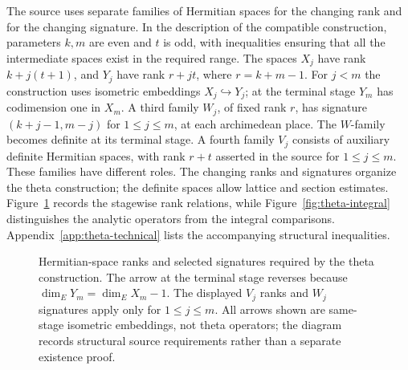 \documentclass[11pt,openany,oneside]{scrbook}
\theoremstyle{definition}
\theoremstyle{remark}
\begin{document}
The source uses separate families of Hermitian spaces for the changing rank and for the changing signature.  In the description of the compatible construction, parameters $k,m$ are even and $t$ is odd, with inequalities ensuring that all the intermediate spaces exist in the required range.  The spaces $X_j$ have rank $k+j(t+1)$, and $Y_j$ have rank $r+jt$, where $r=k+m-1$.  For $j<m$ the construction uses isometric embeddings $X_j\hookrightarrow Y_j$; at the terminal stage $Y_m$ has codimension one in $X_m$.  A third family $W_j$, of fixed rank $r$, has signature $(k+j-1,m-j)$ for $1\le j\le m$, at each archimedean place.  The $W$-family becomes definite at its terminal stage. A fourth family $V_j$ consists of auxiliary definite Hermitian spaces, with rank $r+t$ asserted in the source for $1\le j\le m$. These families have different roles.  The changing ranks and signatures organize the theta construction; the definite spaces allow lattice and section estimates. Figure~\ref{fig:v108-theta-spaces} records the stagewise rank relations, while Figure~\ref{fig:theta-integral} distinguishes the analytic operators from the integral comparisons. Appendix~\ref{app:theta-technical} lists the accompanying structural inequalities.


\begin{figure}[H]
\centering

\caption{Hermitian-space ranks and selected signatures required by the theta construction. The arrow at the terminal stage reverses because $\dim_EY_m=\dim_EX_m-1$. The displayed $V_j$ ranks and $W_j$ signatures apply only for $1\le j\le m$. All arrows shown are same-stage isometric embeddings, not theta operators; the diagram records structural source requirements rather than a separate existence proof.}
\label{fig:v108-theta-spaces}
\end{figure}
\end{document}
